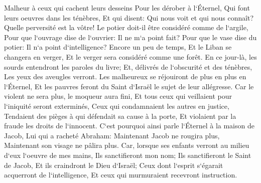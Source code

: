 \verse Malheur à ceux qui cachent leurs desseins Pour les dérober à l`Éternel, Qui font leurs oeuvres dans les ténèbres, Et qui disent: Qui nous voit et qui nous connaît? 
\verse Quelle perversité est la vôtre! Le potier doit-il être considéré comme de l`argile, Pour que l`ouvrage dise de l`ouvrier: Il ne m`a point fait? Pour que le vase dise du potier: Il n`a point d`intelligence? 
\verse Encore un peu de temps, Et le Liban se changera en verger, Et le verger sera considéré comme une forêt. 
\verse En ce jour-là, les sourds entendront les paroles du livre; Et, délivrés de l`obscurité et des ténèbres, Les yeux des aveugles verront. 
\verse Les malheureux se réjouiront de plus en plus en l`Éternel, Et les pauvres feront du Saint d`Israël le sujet de leur allégresse. 
\verse Car le violent ne sera plus, le moqueur aura fini, Et tous ceux qui veillaient pour l`iniquité seront exterminés, 
\verse Ceux qui condamnaient les autres en justice, Tendaient des pièges à qui défendait sa cause à la porte, Et violaient par la fraude les droits de l`innocent. 
\verse C`est pourquoi ainsi parle l`Éternel à la maison de Jacob, Lui qui a racheté Abraham: Maintenant Jacob ne rougira plus, Maintenant son visage ne pâlira plus. 
\verse Car, lorsque ses enfants verront au milieu d`eux l`oeuvre de mes mains, Ils sanctifieront mon nom; Ils sanctifieront le Saint de Jacob, Et ils craindront le Dieu d`Israël; 
\verse Ceux dont l`esprit s`égarait acquerront de l`intelligence, Et ceux qui murmuraient recevront instruction. 

